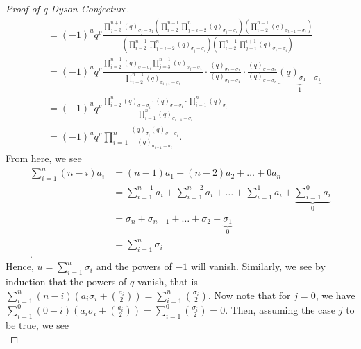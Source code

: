 \begin{proof}[Proof of q-Dyson Conjecture]
\begin{align*}
										   &= \left( -1 \right) ^{u}q^{v} \frac{\prod_{j = 3}^{n + 1} \left( q \right) _{\sigma_{j} - \sigma_1} (\prod_{i= 2}^{n-1} \prod_{j = i + 2}^{n} \left( q \right) _{\sigma_{j} - \sigma_{i}})(\prod_{i=2}^{n-1} \left( q \right) _{\sigma_{n +1} - \sigma_{i}})}{(\prod_{i=2}^{n-1} \prod_{j = i + 2}^{n} \left( q \right) _{\sigma_{j} - \sigma_{i}}) (\prod_{i=2}^{n-1} \prod_{j = i}^{i+1} \left( q \right) _{\sigma_{j} - \sigma_{i}})} \\
										   &= \left( -1 \right) ^{u} q^{v} \frac{\prod_{i= 2}^{n-1} \left( q \right) _{\sigma - \sigma_{i}} \prod_{j = 3}^{n + 1} \left( q \right) _{\sigma_{j} - \sigma_1}}{\prod_{i=2}^{n - 1} \left( q \right) _{\sigma_{i + 1} - \sigma_{i}}} \cdot \frac{\left( q \right)_{\sigma_2 - \sigma_1} }{ \left( q \right) _{\sigma_2 - \sigma_1}}  \cdot \frac{\left( q \right) _{\sigma - \sigma_{n}}}{\left( q \right) _{\sigma - \sigma_{n}}} \underbrace{\left( q \right) _{\sigma_1 - \sigma_1}}_{1} \\
										   &= \left( -1 \right) ^{u}q^{v}\frac{\prod_{i=2}^{n} \left( q \right) _{\sigma - \sigma_{i}}  \cdot \left( q \right) _{\sigma - \sigma_1}\cdot \prod_{i= 1}^{n} \left( q \right) _{\sigma_{i}}}{\prod_{i= 1}^{n} \left( q \right) _{\sigma_{i + 1}- \sigma_{i}}} \\
										   &= \left( -1 \right) ^{u} q^{v} \prod_{i= 1}^{n} \frac{\left( q \right) _{\sigma_{i}} \left( q \right) _{\sigma - \sigma_{i}}}{\left( q \right) _{\sigma_{ i + 1} - \sigma_{i}}}
	.\end{align*}
	From here, we see \begin{align*}
		\sum_{i= 1}^{n} \left( n - i \right) a_{i} &= \left( n - 1 \right) a_1 + \left( n-2 \right) a_2 + \ldots + 0a_{n}\\
							   &= \sum_{i= 1}^{n-1} a_{i} + \sum_{i= 1}^{n-2} a_{i} + \ldots + \sum_{i= 1}^{1} a_{i}  + \underbrace{\sum_{i= 1}^{0} a_{i}}_{0}\\
		&= \sigma_{n} + \sigma_{n-1} + \ldots +\sigma_2 + \underbrace{\sigma_1}_{0}  \\
		&= \sum_{i= 1}^{n} \sigma_{i} \\
	.\end{align*}
	Hence, \(u = \sum_{i= 1}^{n} \sigma_{i}\) and the powers of \(-1\) will vanish. Similarly, we see by induction that the powers of \(q\) vanish, that is \(\sum_{i= 1}^{n} \left( n-i \right) \left( a_{i}\sigma_{i} + \binom{a_{i}}{2} \right)  = \sum_{i= 1}^{n} \binom{\sigma_{i}}{2}\). Now note that for \(j = 0\), we have \(\sum_{i= 1}^{0} \left( 0-i \right) \left( a_{i}\sigma_{i} + \binom{a_{i}}{2} \right)  = \sum_{i= 1}^{0} \binom{\sigma_{i}}{2} = 0\). Then, assuming the case \(j\) to be true, we see \\

\end{proof}
